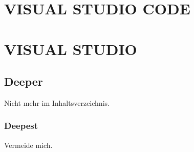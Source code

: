 \section{VISUAL STUDIO CODE}
\section{VISUAL STUDIO}

\subsection{Deeper}
Nicht mehr im Inhaltsverzeichnis.

\subsubsection{Deepest}
Vermeide mich.